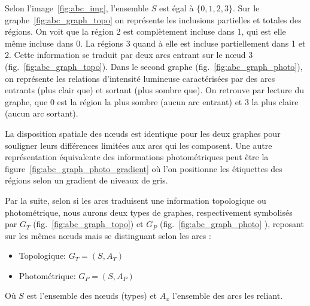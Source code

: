 
	Selon l'image~\ref{fig:abc_img}, l'ensemble $S$ est égal à $\{0,1,2,3\}$. Sur le graphe~\ref{fig:abc_graph_topo} on représente les inclusions partielles et totales des régions. On voit que la région 2 est complètement incluse dans 1, qui est elle même incluse dans 0. La régions 3 quand à elle est incluse partiellement dans 1 et 2. Cette information se traduit par deux arcs entrant sur le n\oe{}ud 3 (fig.~\ref{fig:abc_graph_topo}). Dans le second graphe (fig.~\ref{fig:abc_graph_photo}), on représente les relations d'intensité lumineuse caractérisées par des arcs entrants (plus clair que) et sortant (plus sombre que). On retrouve par lecture du graphe, que 0 est la région la plus sombre (aucun arc entrant) et 3 la plus claire (aucun arc sortant). 
	
	La disposition spatiale des n\oe{}uds est identique pour les deux graphes pour souligner leurs différences limitées aux arcs qui les composent. Une autre représentation équivalente des informations photométriques peut être la figure~\ref{fig:abc_graph_photo_gradient} où l'on positionne les étiquettes des régions selon un gradient de niveaux de gris.

	Par la suite, selon si les arcs traduisent une information topologique ou photométrique, nous aurons deux types de graphes, respectivement symbolisés par $G_T$ (fig.~\ref{fig:abc_graph_topo}) et $G_P$ (fig.~\ref{fig:abc_graph_photo} ), reposant sur les mêmes n\oe{}uds mais se distinguant selon les arcs :
	\begin{itemize}
		\item
		Topologique: $G_T=(S, A_T)$ %
		\item
		Photométrique: $G_P=(S,A_P)$
	\end{itemize}

	 Où $S$ est l'ensemble des n\oe{}uds (types) et $A_x$ l'ensemble des arcs les reliant.
	 
